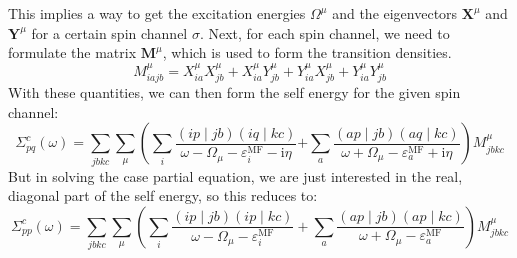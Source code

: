 \documentclass[12pt]{article}
\begin{document}
This implies a way to get the excitation energies $\Omega^\mu$ and the eigenvectors $\mathbf{X}^\mu$ and $\mathbf{Y}^\mu$ for a certain spin channel $\sigma $. Next, for each spin channel, we need to formulate the matrix $\mathbf{M}^{\mu }$, which is used to form the transition densities.
\begin{equation}
M_{i a j b}^{\mu }=X_{i a}^{\mu } X_{j b}^{\mu }+X_{i a}^{\mu } Y_{j b}^{\mu }+Y_{i a}^{\mu } X_{j b}^{\mu }+Y_{i a}^{\mu } Y_{j b}^{\mu }
\end{equation}
With these quantities, we can then form the self energy for the given spin channel:
\begin{equation}
\Sigma_{p q}^c\left(\omega \right)= \sum_{j b k c} \sum_{\mu }\left(\sum_i \frac{(i p \mid j b)(i q \mid k c)}{\omega -\Omega_{\mu }-\varepsilon_i^{\mathrm{MF}}-\mathrm{i} \eta}\right.
\left.+\sum_a \frac{(a p \mid j b)(a q \mid k c)}{\omega +\Omega_{\mu }-\varepsilon_a^{\mathrm{MF}}+\mathrm{i} \eta}\right) M_{j b k c}^{\mu }
\label{eq:Sigma}
\end{equation}
But in solving the case partial equation, we are just interested in the real, diagonal part of the self energy, so this reduces to:
\begin{equation}
\Sigma_{p p}^c\left(\omega \right)= \sum_{j b k c} \sum_{\mu }\left(\sum_i \frac{(i p \mid j b)(i p \mid k c)}{\omega -\Omega_{\mu }-\varepsilon_i^{\mathrm{MF}}} + \sum_a \frac{(a p \mid j b)(a p \mid k c)}{\omega +\Omega_{\mu }-\varepsilon_a^{\mathrm{MF}}}\right) M_{j b k c}^{\mu }
\end{equation}
\end{document}
